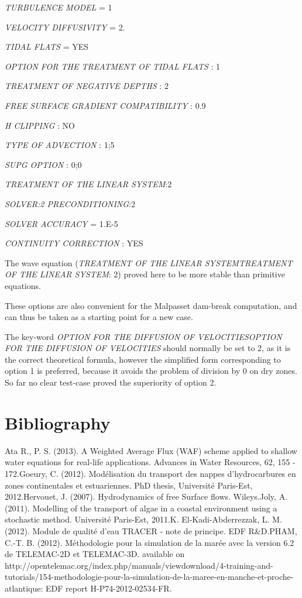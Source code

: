 \documentclass{article} %
\begin{document}
 \textit{TURBULENCE MODEL} = 1

 \textit{VELOCITY DIFFUSIVITY} = 2.

 \textit{TIDAL FLATS} = YES

 \textit{OPTION FOR THE TREATMENT OF TIDAL FLATS} : 1

 \textit{TREATMENT OF NEGATIVE DEPTHS} : 2

 \textit{FREE SURFACE GRADIENT COMPATIBILITY} : 0.9

 \textit{H CLIPPING} : NO

 \textit{TYPE OF ADVECTION} : 1;5

 \textit{SUPG OPTION} :       0;0

 \textit{TREATMENT OF THE LINEAR SYSTEM}:2

 \textit{SOLVER:2 PRECONDITIONING}:2

 \textit{SOLVER ACCURACY} = 1.E-5

 \textit{CONTINUITY CORRECTION} : YES

 The wave equation (\textit{TREATMENT OF THE LINEAR SYSTEMTREATMENT OF THE LINEAR SYSTEM}: 2) proved here to be more stable than primitive equations.

 These options are also convenient for the Malpasset dam-break computation, and can thus be taken as a starting point for a new case.

 The key-word \textit{OPTION FOR THE DIFFUSION OF VELOCITIESOPTION FOR THE DIFFUSION OF VELOCITIES} should normally be set to 2, as it is the correct theoretical formula, however the simplified form corresponding to option 1 is preferred, because it avoids the problem of division by 0 on dry zones. So far no clear test-case proved the superiority of option 2.




\section{Bibliography}

 Ata R., P. S. (2013). A Weighted Average Flux (WAF) scheme applied to shallow water equations for real-life applications. Advances in Water Resources, 62, 155 - 172.Goeury, C. (2012). Mod\'{e}lisation du transport des nappes d'hydrocarbures en zones continentales et estuariennes. PhD thesis, Universit\'{e} Paris-Est, 2012.Hervouet, J. (2007). Hydrodynamics of free Surface flows. Wileys.Joly, A. (2011). Modelling of the transport of algae in a coastal environment using a stochastic method. Universit\'{e} Paris-Est, 2011.K. El-Kadi-Abderrezzak, L. M. (2012). Module de qualit\'{e} d'eau TRACER - note de principe. EDF R\&D.PHAM, C.-T. B. (2012). M\'{e}thodologie pour la simulation de la mar\'{e}e avec la version 6.2 de TELEMAC-2D et TELEMAC-3D. available on http://opentelemac.org/index.php/manuals/viewdownload/4-training-and-tutorials/154-methodologie-pour-la-simulation-de-la-maree-en-manche-et-proche-atlantique: EDF report H-P74-2012-02534-FR.
\end{document}

